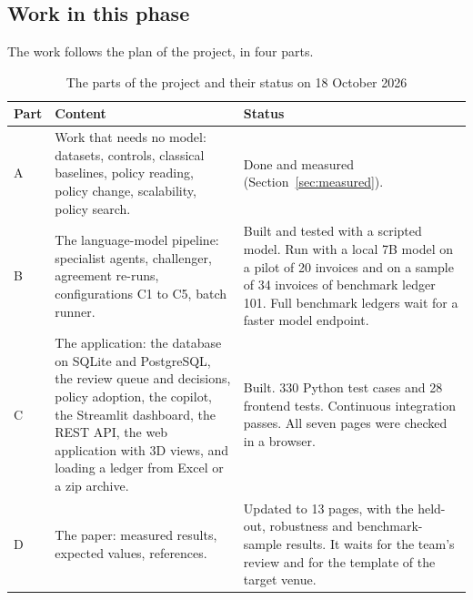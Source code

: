 \documentclass[11pt,a4paper]{article}
\begin{document}
\subsection{Work in this phase}
The work follows the plan of the project, in four parts.

\begin{table}[htbp]
\caption{The parts of the project and their status on 18 October 2026}
\label{tab:phases}
\centering
\small
\begin{tabular}{L{1.5cm}L{6.6cm}L{7.2cm}}
\toprule
Part & Content & Status \\
\midrule
A & Work that needs no model: datasets, controls, classical baselines, policy reading, policy change, scalability, policy search. & Done and measured (Section~\ref{sec:measured}). \\
B & The language-model pipeline: specialist agents, challenger, agreement re-runs, configurations C1 to C5, batch runner. & Built and tested with a scripted model. Run with a local 7B model on a pilot of 20 invoices and on a sample of 34 invoices of benchmark ledger 101. Full benchmark ledgers wait for a faster model endpoint. \\
C & The application: the database on SQLite and PostgreSQL, the review queue and decisions, policy adoption, the copilot, the Streamlit dashboard, the REST API, the web application with 3D views, and loading a ledger from Excel or a zip archive. & Built. 330 Python test cases and 28 frontend tests. Continuous integration passes. All seven pages were checked in a browser. \\
D & The paper: measured results, expected values, references. & Updated to 13 pages, with the held-out, robustness and benchmark-sample results. It waits for the team's review and for the template of the target venue. \\
\bottomrule
\end{tabular}
\end{table}
\end{document}
